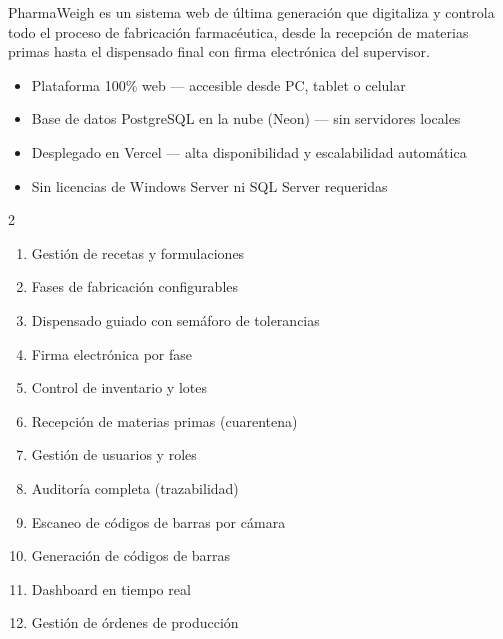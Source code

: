 \documentclass[11pt]{article}
\begin{document}

PharmaWeigh es un sistema web de última generación que digitaliza y controla todo el proceso de fabricación farmacéutica, desde la recepción de materias primas hasta el dispensado final con firma electrónica del supervisor.

\begin{itemize}
    \item Plataforma 100\% web --- accesible desde PC, tablet o celular
    \item Base de datos PostgreSQL en la nube (Neon) --- sin servidores locales
    \item Desplegado en Vercel --- alta disponibilidad y escalabilidad automática
    \item Sin licencias de Windows Server ni SQL Server requeridas
\end{itemize}


\begin{cajaTip}
\begin{multicols}{2}
\begin{enumerate}
    \item Gestión de recetas y formulaciones
    \item Fases de fabricación configurables
    \item Dispensado guiado con semáforo de tolerancias
    \item Firma electrónica por fase
    \item Control de inventario y lotes
    \item Recepción de materias primas (cuarentena)
    \item Gestión de usuarios y roles
    \item Auditoría completa (trazabilidad)
    \item Escaneo de códigos de barras por cámara
    \item Generación de códigos de barras
    \item Dashboard en tiempo real
    \item Gestión de órdenes de producción
\end{enumerate}
\end{multicols}
\end{cajaTip}

\end{document}
